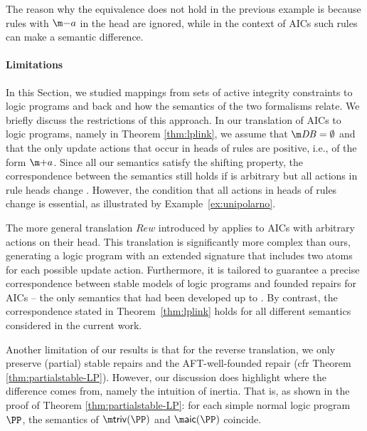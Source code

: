 The reason why the equivalence does not hold in the previous example is because rules with $\remove a$ in the head are ignored, while in the context of AICs such rules can make a semantic difference. 

\paragraph{Limitations}
In this Section, we studied mappings from sets of active integrity constraints to logic programs and back and how the semantics of the two formalisms relate. 
We briefly discuss the restrictions of this approach. 
In our translation of AICs to logic programs, namely in Theorem \ref{thm:lplink}, we assume that $\db=\emptyset$ and that the only update actions that occur in heads of rules are positive, i.e., of the form $\add a$. 
Since all our semantics satisfy the shifting property, the correspondence between the semantics still holds if \db is arbitrary but all actions in rule heads change \db. 
However, the condition that all actions in heads of rules change \db is essential,
as illustrated by Example~\ref{ex:unipolarno}.

The more general translation $\mathit{Rew}$ introduced by \citet{iclp/CaropreseGSZ06} applies to AICs with arbitrary actions on their head.
This translation is significantly more complex than ours, generating a logic program with an extended signature that includes two atoms for each possible update action.
Furthermore, it is tailored to guarantee a precise correspondence between stable models of logic programs and founded repairs for AICs -- the only semantics that had been developed up to \cite{iclp/CaropreseGSZ06}.
By contrast, the correspondence stated in Theorem~\ref{thm:lplink} holds for all different semantics considered in the current work.

Another limitation of our results is that for the reverse translation, we only preserve (partial) stable repairs and the AFT-well-founded repair (cfr Theorem \ref{thm:partialstable-LP}). 
However, our discussion does highlight where the difference comes from, namely the intuition of inertia. 
That is, as shown in the proof of Theorem \ref{thm:partialstable-LP}: for each simple normal logic program $\PP$, the semantics of $\triv(\PP)$ and $\aicop(\PP)$ coincide. 

